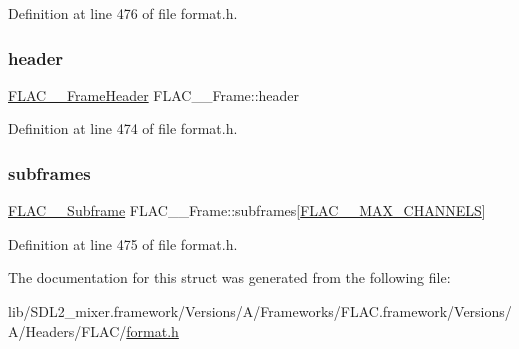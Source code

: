 Definition at line 476 of file format.\+h.

\mbox{\label{struct_f_l_a_c_____frame_ae39796592bb27512110976fe7b80ce06}} 
\subsubsection{\texorpdfstring{header}{header}}
{\footnotesize\ttfamily \mbox{\hyperlink{struct_f_l_a_c_____frame_header}{F\+L\+A\+C\+\_\+\+\_\+\+Frame\+Header}} F\+L\+A\+C\+\_\+\+\_\+\+Frame\+::header}



Definition at line 474 of file format.\+h.

\mbox{\label{struct_f_l_a_c_____frame_a526e3e6173e7a6db752e7a44bff3e91d}} 
\subsubsection{\texorpdfstring{subframes}{subframes}}
{\footnotesize\ttfamily \mbox{\hyperlink{struct_f_l_a_c_____subframe}{F\+L\+A\+C\+\_\+\+\_\+\+Subframe}} F\+L\+A\+C\+\_\+\+\_\+\+Frame\+::subframes\mbox{[}\mbox{\hyperlink{group__flac__format_ga488aa5678a58d08f984f5d39185b763d}{F\+L\+A\+C\+\_\+\+\_\+\+M\+A\+X\+\_\+\+C\+H\+A\+N\+N\+E\+LS}}\mbox{]}}



Definition at line 475 of file format.\+h.



The documentation for this struct was generated from the following file\+:\begin{DoxyCompactItemize}
\item 
lib/\+S\+D\+L2\+\_\+mixer.\+framework/\+Versions/\+A/\+Frameworks/\+F\+L\+A\+C.\+framework/\+Versions/\+A/\+Headers/\+F\+L\+A\+C/\mbox{\hyperlink{format_8h}{format.\+h}}\end{DoxyCompactItemize}
